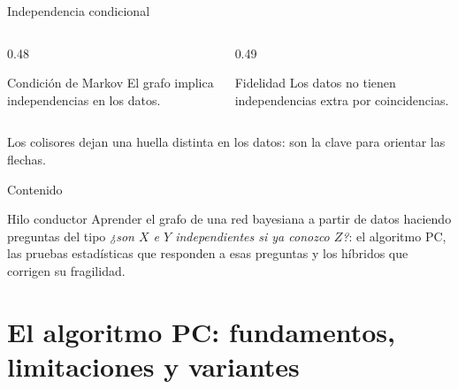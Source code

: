 \documentclass[aspectratio=169,11pt]{beamer}
\begin{document}
\begin{frame}[t]{Independencia condicional}
\begin{columns}[T,onlytextwidth]
\begin{column}{0.48\textwidth}
\begin{block}{Condición de Markov}
        El grafo implica independencias en los datos.
      \end{block}
    \end{column}
    \begin{column}{0.49\textwidth}
      \begin{block}{Fidelidad}
        Los datos no tienen independencias extra por coincidencias.
      \end{block}
    \end{column}
  \end{columns}
  \vfill
  {\scriptsize\color{upmgray}Los colisores dejan una huella distinta en los
  datos: son la clave para orientar las flechas.}
\end{frame}

\begin{frame}[t]{Contenido}
  \tableofcontents[hideallsubsections]
  \vfill
  \begin{block}{Hilo conductor}
    Aprender el grafo de una red bayesiana a partir de datos haciendo
    preguntas del tipo \emph{¿son $X$ e $Y$ independientes si ya conozco $Z$?}:
    el algoritmo PC, las pruebas estadísticas que responden a esas preguntas
    y los híbridos que corrigen su fragilidad.
  \end{block}
\end{frame}

\section[El algoritmo PC]{El algoritmo PC: fundamentos, limitaciones y variantes}
\end{document}
